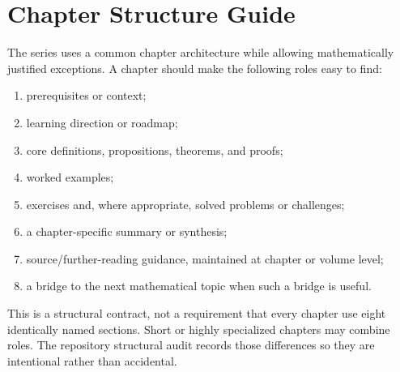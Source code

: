 \chapter*{Chapter Structure Guide}
{}

The series uses a common chapter architecture while allowing mathematically
justified exceptions.  A chapter should make the following roles easy to find:

\begin{enumerate}
\item prerequisites or context;
\item learning direction or roadmap;
\item core definitions, propositions, theorems, and proofs;
\item worked examples;
\item exercises and, where appropriate, solved problems or challenges;
\item a chapter-specific summary or synthesis;
\item source/further-reading guidance, maintained at chapter or volume level;
\item a bridge to the next mathematical topic when such a bridge is useful.
\end{enumerate}

This is a structural contract, not a requirement that every chapter use eight
identically named sections.  Short or highly specialized chapters may combine
roles.  The repository structural audit records those differences so they are
intentional rather than accidental.
